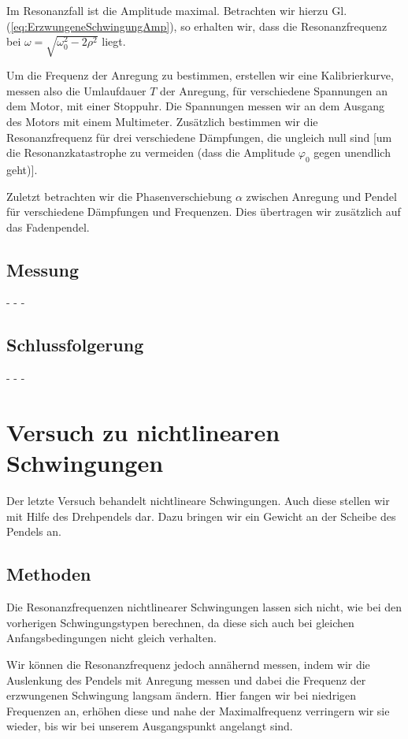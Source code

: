 \documentclass[11pt,a4paper,titlepage, ngerman]{article}
\newcommand{\refeq}[1]{Gl. (\ref{eq:#1})}
\begin{document}
			Im Resonanzfall ist die Amplitude maximal. Betrachten wir hierzu \refeq{ErzwungeneSchwingungAmp}, so erhalten wir, dass die Resonanzfrequenz bei $\omega = \sqrt{\omega_0^2-2\rho^2}$ liegt.
			
			Um die Frequenz der Anregung zu bestimmen, erstellen wir eine Kalibrierkurve, messen also die Umlaufdauer $T$ der Anregung, für verschiedene Spannungen an dem Motor, mit einer Stoppuhr. Die Spannungen messen wir an dem Ausgang des Motors mit einem Multimeter.
			Zusätzlich bestimmen wir die Resonanzfrequenz für drei verschiedene Dämpfungen, die ungleich null sind [um die Resonanzkatastrophe zu vermeiden (dass die Amplitude $\varphi_0$ gegen unendlich geht)].
				
			Zuletzt betrachten wir die Phasenverschiebung $\alpha$ zwischen Anregung und Pendel für verschiedene Dämpfungen und Frequenzen. Dies übertragen wir zusätzlich auf das Fadenpendel.
		
		\subsection*{Messung}
			
			- - -
			
		\subsection*{Schlussfolgerung}
			
			- - -
			
	\section{Versuch zu nichtlinearen Schwingungen}
	
		Der letzte Versuch behandelt nichtlineare Schwingungen. Auch diese stellen wir mit Hilfe des Drehpendels dar. Dazu bringen wir ein Gewicht an der Scheibe des Pendels an.
		
		\subsection*{Methoden}
				
				Die Resonanzfrequenzen nichtlinearer Schwingungen lassen sich nicht, wie bei den vorherigen Schwingungstypen berechnen, da diese sich auch bei gleichen Anfangsbedingungen nicht gleich verhalten.
				
				Wir können die Resonanzfrequenz jedoch annähernd messen, indem wir die Auslenkung des Pendels mit Anregung messen und dabei die Frequenz der erzwungenen Schwingung langsam ändern.
				Hier fangen wir bei niedrigen Frequenzen an, erhöhen diese und nahe der Maximalfrequenz verringern wir sie wieder, bis wir bei unserem Ausgangspunkt angelangt sind.
		
\end{document}
